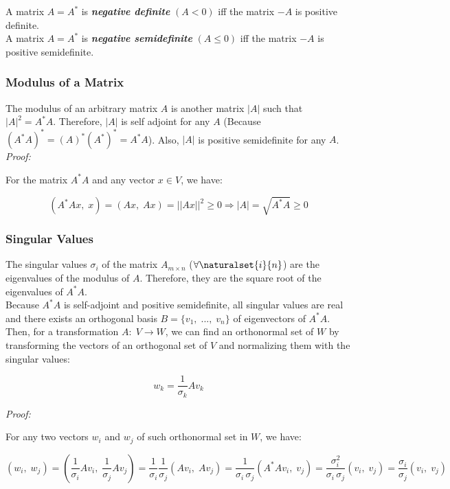 A matrix $A=A^*$ is \textit{\textbf{negative definite}} $(A<0)$ iff the matrix $-A$ is positive definite.\\

A matrix $A=A^*$ is \textit{\textbf{negative semidefinite}} $(A\leq0)$ iff the matrix $-A$ is positive semidefinite.

\subsubsection*{Modulus of a Matrix}

The modulus of an arbitrary matrix $A$ is another matrix $|A|$ such that $|A|^2=A^*A$. Therefore, $|A|$ is self adjoint for any $A$ (Because $(A^*A)^*=(A)^*(A^*)^*=A^*A$). Also, $|A|$ is positive semidefinite for any $A$.\\

\textit{Proof:}

For the matrix $A^*A$ and any vector $x\in V$, we have:

$$(A^*Ax,\;x)=(Ax,\;Ax)=||Ax||^2\geq 0 \Rightarrow |A|=\sqrt{A^*A}\geq 0$$

\subsubsection*{Singular Values}

The singular values $\sigma_i$ of the matrix $A_{m \times n}$ ($\forall \naturalset{i}{n}$) are the eigenvalues of the modulus of $A$. Therefore, they are the square root of the eigenvalues of $A^*A$.\\

Because $A^*A$ is self-adjoint and positive semidefinite, all singular values are real and there exists an orthogonal basis $B=\{v_1,\;...,\;v_n\}$ of eigenvectors of $A^*A$. Then, for a transformation $A:\;V\rightarrow W$, we can find an orthonormal set of $W$ by transforming the vectors of an orthogonal set of $V$ and normalizing them with the singular values: 

$$w_k=\frac{1}{\sigma_k} Av_k$$

\textit{Proof:}

For any two vectors $w_i$ and $w_j$ of such orthonormal set in $W$, we have:

$$(w_i,\;w_j)=\left(\frac{1}{\sigma_i}Av_i,\;\frac{1}{\sigma_j}Av_j\right)=\frac{1}{\sigma_i} 
\frac{1}{\sigma_j}(Av_i,\;Av_j)=\frac{1}{\sigma_i\,\sigma_j} (A^*Av_i,\;v_j)=\frac{\sigma_i^2}{\sigma_i\,\sigma_j} (v_i,\;v_j)=\frac{\sigma_i}{\sigma_j} (v_i,\;v_j)$$

